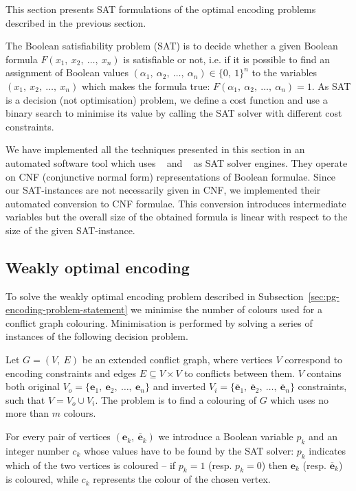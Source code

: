 This section presents SAT formulations of the optimal encoding problems
described in the previous section.

The Boolean satisfiability problem (SAT) is to decide whether a given
Boolean formula $F(x_{1},\ x_{2},\ \dots,\ x_{n})$ is satisfiable
or not, i.e. if it is possible to find an assignment of Boolean values
$(\alpha_{1},\ \alpha_{2},\ \dots,\ \alpha_{n})\in\{0,\ 1\}^{n}$
to the variables $(x_{1},\ x_{2},\ \dots,\ x_{n})$ which makes the
formula true: $F(\alpha_{1},\ \alpha_{2},\ \dots,\ \alpha_{n})=1$.
As SAT is a decision (not optimisation) problem, we define a cost
function and use a binary search to minimise its value by calling
the SAT solver with different cost constraints.

We have implemented all the techniques presented in this section in
an automated software tool which uses ~\cite{2004_miniSAT_lncs} and ~\cite{clasp}
as SAT solver engines. They operate on CNF (conjunctive
normal form) representations of Boolean formulae. Since our SAT-instances
are not necessarily given in CNF, we implemented their automated conversion
to CNF formulae. This conversion introduces intermediate variables
but the overall size of the obtained formula is linear with respect
to the size of the given SAT-instance.



\subsection{Weakly optimal encoding}

To solve the weakly optimal encoding problem described 
in Subsection~\ref{sec:pg-encoding-problem-statement}
we minimise the number of colours used for a conflict graph colouring.
Minimisation is performed by solving a series of instances of the
following decision problem.

Let $G=(V,\ E)$ be an extended conflict graph, where vertices $V$
correspond to encoding constraints and edges $E\subseteq V\times V$
to conflicts between them. $V$ contains both original $V_{o}=\{\mathbf{e}_{1},\ \mathbf{e}_{2},\ \dots,\ \mathbf{e}_{n}\}$
and inverted $V_{i}=\{\mathbf{\overline{\mathbf{e}}}_{1},\ \mathbf{\overline{\mathbf{e}}}_{2},\ \dots,\ \mathbf{\overline{\mathbf{e}}}_{n}\}$
constraints, such that $V=V_{o}\cup V_{i}$. The problem is to find
a colouring of $G$ which uses no more than $m$ colours.

For every pair of vertices $(\mathbf{e}_{k},\ \mathbf{\overline{\mathbf{e}}}_{k})$
we introduce a Boolean variable $p_{k}$ and an integer number $c_{k}$
whose values have to be found by the SAT solver: $p_{k}$ indicates
which of the two vertices is coloured -- if $p_{k}=1$ (resp. $p_{k}=0$)
then $\mathbf{e}_{k}$ (resp. $\overline{\mathbf{e}}_{k}$) is coloured,
while $c_{k}$ represents the colour of the chosen vertex. 

